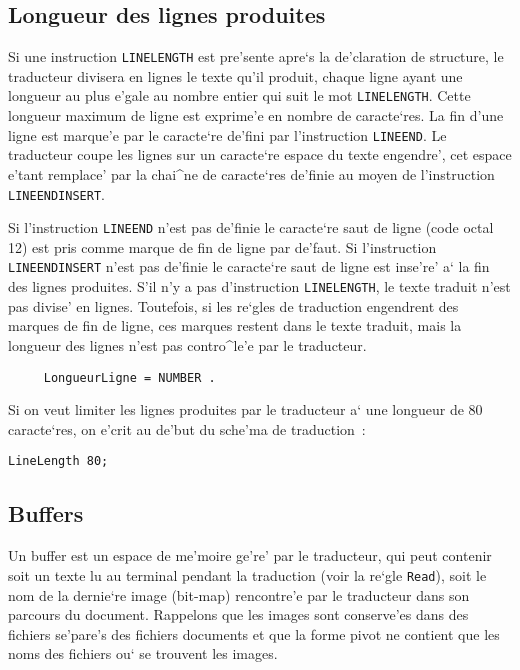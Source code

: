 {\subsection{Longueur des lignes produites}
\label{longueurligne}

Si une instruction {\tt LINELENGTH} est pre'sente apre`s la de'claration de
structure, le traducteur divisera en lignes le texte qu'il produit, chaque
ligne ayant une longueur au plus e'gale au nombre entier qui suit le mot
{\tt LINELENGTH}. Cette longueur maximum de ligne est exprime'e en nombre de
caracte`res. La fin d'une ligne est marque'e par le caracte`re de'fini
par l'instruction {\tt LINEEND}.
Le traducteur coupe les lignes sur un caracte`re espace du texte
engendre', cet espace e'tant remplace' par la chai^ne de caracte`res
de'finie au moyen de l'instruction {\tt LINEENDINSERT}.

Si l'instruction {\tt LINEEND} n'est pas de'finie le caracte`re saut
de ligne (code octal 12) est pris comme marque de fin de ligne par de'faut.
Si l'instruction {\tt LINEENDINSERT} n'est pas de'finie le caracte`re saut
de ligne est inse're' a` la fin des lignes produites.
S'il n'y a pas d'instruction {\tt LINELENGTH}, le texte traduit n'est pas
divise' en lignes. Toutefois, si les re`gles de traduction engendrent des
marques de fin de ligne, ces marques restent
dans le texte traduit, mais la longueur des lignes n'est pas contro^le'e
par le traducteur.

\begin{verbatim}
     LongueurLigne = NUMBER .
\end{verbatim}

\begin{example}
Si on veut limiter les lignes produites par le traducteur a` une longueur
de 80 caracte`res, on e'crit au de'but du sche'ma de traduction~:
\begin{verbatim}
LineLength 80;
\end{verbatim}
\end{example}

\subsection{Buffers}

Un buffer est un espace de me'moire ge're' par le traducteur, qui peut
contenir soit un texte lu au terminal pendant la traduction (voir la re`gle
{\tt Read}), soit le nom de la dernie`re image (bit-map) rencontre'e par le
traducteur dans son parcours du document. Rappelons que les images sont
conserve'es dans des fichiers se'pare's des fichiers documents et que la
forme pivot ne contient que les noms des fichiers ou` se trouvent les images.

}
